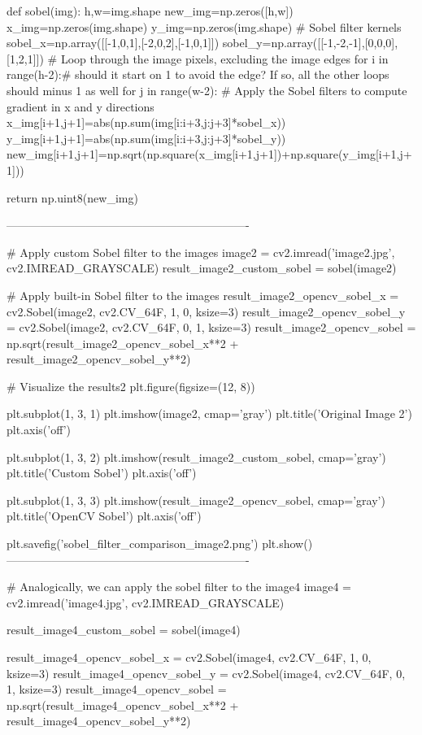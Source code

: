 \documentclass[12pt]{article}
\begin{document}
\begin{python}
def sobel(img):
    h,w=img.shape
    new_img=np.zeros([h,w])
    x_img=np.zeros(img.shape)
    y_img=np.zeros(img.shape)
    # Sobel filter kernels
    sobel_x=np.array([[-1,0,1],[-2,0,2],[-1,0,1]])
    sobel_y=np.array([[-1,-2,-1],[0,0,0],[1,2,1]])
    # Loop through the image pixels, excluding the image edges
    for i in range(h-2):# should it start on 1 to avoid the edge? If so, all the other loops should minus 1 as well
        for j in range(w-2):
             # Apply the Sobel filters to compute gradient in x and y directions
            x_img[i+1,j+1]=abs(np.sum(img[i:i+3,j:j+3]*sobel_x))
            y_img[i+1,j+1]=abs(np.sum(img[i:i+3,j:j+3]*sobel_y))
            new_img[i+1,j+1]=np.sqrt(np.square(x_img[i+1,j+1])+np.square(y_img[i+1,j+1]))

    return np.uint8(new_img)

----------------------------------------------------------------

# Apply custom Sobel filter to the images
image2 = cv2.imread('image2.jpg', cv2.IMREAD_GRAYSCALE)
result_image2_custom_sobel = sobel(image2)

# Apply built-in Sobel filter to the images
result_image2_opencv_sobel_x = cv2.Sobel(image2, cv2.CV_64F, 1, 0, ksize=3)
result_image2_opencv_sobel_y = cv2.Sobel(image2, cv2.CV_64F, 0, 1, ksize=3)
result_image2_opencv_sobel = np.sqrt(result_image2_opencv_sobel_x**2 + result_image2_opencv_sobel_y**2)

# Visualize the results2
plt.figure(figsize=(12, 8))

plt.subplot(1, 3, 1)
plt.imshow(image2, cmap='gray')
plt.title('Original Image 2')
plt.axis('off')

plt.subplot(1, 3, 2)
plt.imshow(result_image2_custom_sobel, cmap='gray')
plt.title('Custom Sobel')
plt.axis('off')

plt.subplot(1, 3, 3)
plt.imshow(result_image2_opencv_sobel, cmap='gray')
plt.title('OpenCV Sobel')
plt.axis('off')

plt.savefig('sobel_filter_comparison_image2.png')
plt.show() 
----------------------------------------------------------------

# Analogically, we can apply the sobel filter to the image4
image4 = cv2.imread('image4.jpg', cv2.IMREAD_GRAYSCALE)

result_image4_custom_sobel = sobel(image4)

result_image4_opencv_sobel_x = cv2.Sobel(image4, cv2.CV_64F, 1, 0, ksize=3)
result_image4_opencv_sobel_y = cv2.Sobel(image4, cv2.CV_64F, 0, 1, ksize=3)
result_image4_opencv_sobel = np.sqrt(result_image4_opencv_sobel_x**2 + result_image4_opencv_sobel_y**2)


\end{python}
\end{document}
